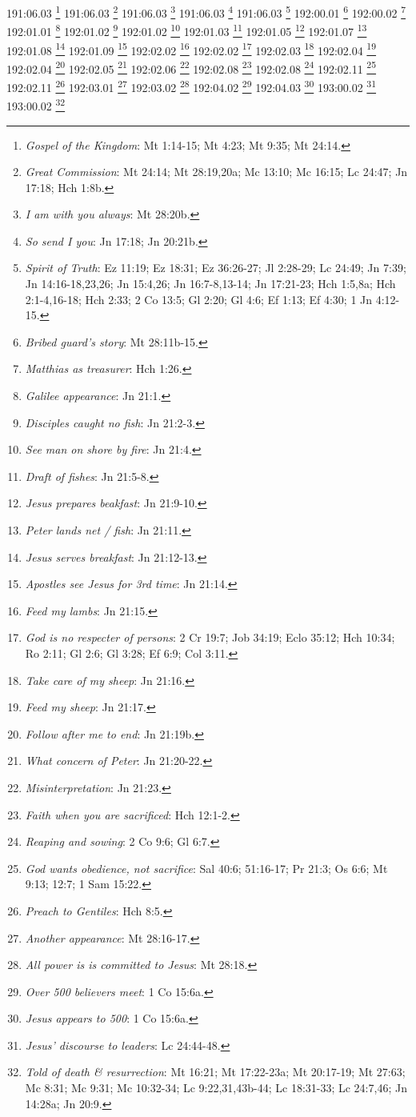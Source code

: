 191:06.03 \footnote{\textit{Gospel of the Kingdom}: Mt 1:14-15; Mt 4:23; Mt 9:35; Mt 24:14.}
191:06.03 \footnote{\textit{Great Commission}: Mt 24:14; Mt 28:19,20a; Mc 13:10; Mc 16:15; Lc 24:47; Jn 17:18; Hch 1:8b.}
191:06.03 \footnote{\textit{I am with you always}: Mt 28:20b.}
191:06.03 \footnote{\textit{So send I you}: Jn 17:18; Jn 20:21b.}
191:06.03 \footnote{\textit{Spirit of Truth}: Ez 11:19; Ez 18:31; Ez 36:26-27; Jl 2:28-29; Lc 24:49; Jn 7:39; Jn 14:16-18,23,26; Jn 15:4,26; Jn 16:7-8,13-14; Jn 17:21-23; Hch 1:5,8a; Hch 2:1-4,16-18; Hch 2:33; 2 Co 13:5; Gl 2:20; Gl 4:6; Ef 1:13; Ef 4:30; 1 Jn 4:12-15.}
192:00.01 \footnote{\textit{Bribed guard's story}: Mt 28:11b-15.}
192:00.02 \footnote{\textit{Matthias as treasurer}: Hch 1:26.}
192:01.01 \footnote{\textit{Galilee appearance}: Jn 21:1.}
192:01.02 \footnote{\textit{Disciples caught no fish}: Jn 21:2-3.}
192:01.02 \footnote{\textit{See man on shore by fire}: Jn 21:4.}
192:01.03 \footnote{\textit{Draft of fishes}: Jn 21:5-8.}
192:01.05 \footnote{\textit{Jesus prepares beakfast}: Jn 21:9-10.}
192:01.07 \footnote{\textit{Peter lands net / fish}: Jn 21:11.}
192:01.08 \footnote{\textit{Jesus serves breakfast}: Jn 21:12-13.}
192:01.09 \footnote{\textit{Apostles see Jesus for 3rd time}: Jn 21:14.}
192:02.02 \footnote{\textit{Feed my lambs}: Jn 21:15.}
192:02.02 \footnote{\textit{God is no respecter of persons}: 2 Cr 19:7; Job 34:19; Eclo 35:12; Hch 10:34; Ro 2:11; Gl 2:6; Gl 3:28; Ef 6:9; Col 3:11.}
192:02.03 \footnote{\textit{Take care of my sheep}: Jn 21:16.}
192:02.04 \footnote{\textit{Feed my sheep}: Jn 21:17.}
192:02.04 \footnote{\textit{Follow after me to end}: Jn 21:19b.}
192:02.05 \footnote{\textit{What concern of Peter}: Jn 21:20-22.}
192:02.06 \footnote{\textit{Misinterpretation}: Jn 21:23.}
192:02.08 \footnote{\textit{Faith when you are sacrificed}: Hch 12:1-2.}
192:02.08 \footnote{\textit{Reaping and sowing}: 2 Co 9:6; Gl 6:7.}
192:02.11 \footnote{\textit{God wants obedience, not sacrifice}: Sal 40:6; 51:16-17; Pr 21:3; Os 6:6; Mt 9:13; 12:7; 1 Sam 15:22.}
192:02.11 \footnote{\textit{Preach to Gentiles}: Hch 8:5.}
192:03.01 \footnote{\textit{Another appearance}: Mt 28:16-17.}
192:03.02 \footnote{\textit{All power is is committed to Jesus}: Mt 28:18.}
192:04.02 \footnote{\textit{Over 500 believers meet}: 1 Co 15:6a.}
192:04.03 \footnote{\textit{Jesus appears to 500}: 1 Co 15:6a.}
193:00.02 \footnote{\textit{Jesus' discourse to leaders}: Lc 24:44-48.}
193:00.02 \footnote{\textit{Told of death & resurrection}: Mt 16:21; Mt 17:22-23a; Mt 20:17-19; Mt 27:63; Mc 8:31; Mc 9:31; Mc 10:32-34; Lc 9:22,31,43b-44; Lc 18:31-33; Lc 24:7,46; Jn 14:28a; Jn 20:9.}
